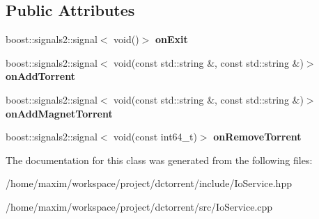 \subsection*{Public Attributes}
\begin{DoxyCompactItemize}
\item 
\mbox{\label{class_io_service_a73ba0e3791bb6e4ca91710e64190bdc8}} 
boost\+::signals2\+::signal$<$ void()$>$ {\bfseries on\+Exit}
\item 
\mbox{\label{class_io_service_a41f4e5cd7d74e4e460d611f963e75e80}} 
boost\+::signals2\+::signal$<$ void(const std\+::string \&, const std\+::string \&)$>$ {\bfseries on\+Add\+Torrent}
\item 
\mbox{\label{class_io_service_a1cf1999d7f3b8892c4fffcca4c70c2ab}} 
boost\+::signals2\+::signal$<$ void(const std\+::string \&, const std\+::string \&)$>$ {\bfseries on\+Add\+Magnet\+Torrent}
\item 
\mbox{\label{class_io_service_a1337445563eb8d6ceaa508e27672ca81}} 
boost\+::signals2\+::signal$<$ void(const int64\+\_\+t)$>$ {\bfseries on\+Remove\+Torrent}
\end{DoxyCompactItemize}


The documentation for this class was generated from the following files\+:\begin{DoxyCompactItemize}
\item 
/home/maxim/workspace/project/dctorrent/include/Io\+Service.\+hpp\item 
/home/maxim/workspace/project/dctorrent/src/Io\+Service.\+cpp\end{DoxyCompactItemize}
